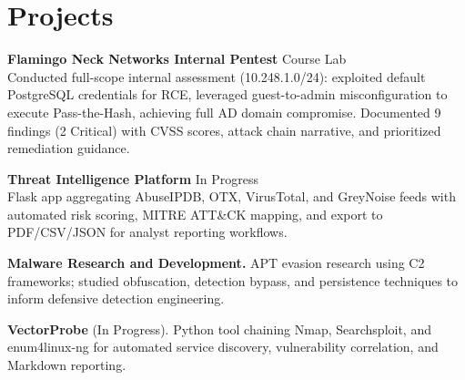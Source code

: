 \documentclass{resume2}
\begin{document}
\section{Projects}

\textbf{Flamingo Neck Networks Internal Pentest} \hfill Course Lab\\
Conducted full-scope internal assessment (10.248.1.0/24): exploited default PostgreSQL credentials for RCE, leveraged guest-to-admin misconfiguration to execute Pass-the-Hash, achieving full AD domain compromise. Documented 9 findings (2 Critical) with CVSS scores, attack chain narrative, and prioritized remediation guidance.

\medskip
\textbf{Threat Intelligence Platform} \hfill In Progress\\
Flask app aggregating AbuseIPDB, OTX, VirusTotal, and GreyNoise feeds with automated risk scoring, MITRE ATT\&CK mapping, and export to PDF/CSV/JSON for analyst reporting workflows.

\medskip
\textbf{Malware Research and Development.} APT evasion research using C2 frameworks; studied obfuscation, detection bypass, and persistence techniques to inform defensive detection engineering.

\medskip
\textbf{VectorProbe} (In Progress). Python tool chaining Nmap, Searchsploit, and enum4linux-ng for automated service discovery, vulnerability correlation, and Markdown reporting.
\end{document}
